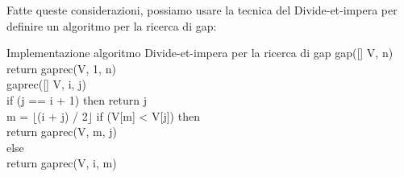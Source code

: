 \begin{problem}
    \noindent
    Fatte queste considerazioni, possiamo usare la tecnica del Divide-et-impera
    per definire un algoritmo per la ricerca di gap:
    \begin{minicode}{Implementazione algoritmo Divide-et-impera per la ricerca di gap}
        \ind{} gap([] V,  n)\\
            return gaprec(V, 1, n)\\

        \ind{} gaprec([] V,  i,  j)\\
            \indf if (j == i + 1) then\hfill{}
                return j\\
            \indf{} m = $\lfloor$(i + j) / 2$\rfloor$\hfill\com{Scelta dell'indice $m\in\,]i,j[$}
            \indf if (V[m] < V[j]) then\\
                return gaprec(V, m, j)\\
            \indf else\\
                return gaprec(V, i, m)
    \end{minicode}
\end{problem}